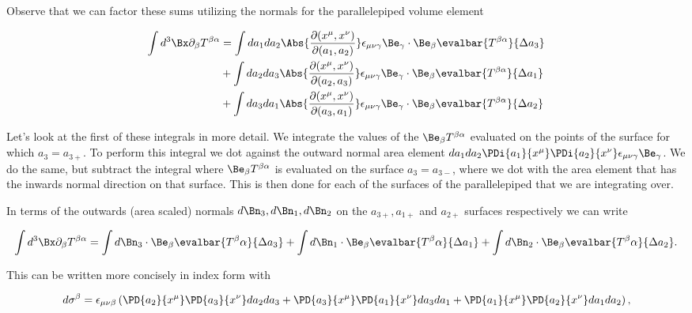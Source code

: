 Observe that we can factor these sums utilizing the normals for the parallelepiped volume element

\begin{align*}
\int d^3 \Bx \partial_\beta T^{\beta \alpha}
&=
\int da_1 da_2 
\Abs{ \frac{\partial(x^\mu, x^\nu)}{\partial (a_1, a_2)}} \epsilon_{\mu \nu \gamma} \Be_\gamma \cdot \Be_\beta
\evalbar{T^{\beta \alpha}}{\Delta a_3} \\
&+
\int da_2 da_3 
\Abs{ \frac{\partial(x^\mu, x^\nu)}{\partial (a_2, a_3)}} \epsilon_{\mu \nu \gamma} \Be_\gamma \cdot \Be_\beta
\evalbar{T^{\beta \alpha}}{\Delta a_1} \\
&+
\int da_3 da_1 
\Abs{ \frac{\partial(x^\mu, x^\nu)}{\partial (a_3, a_1)}} \epsilon_{\mu \nu \gamma} \Be_\gamma \cdot \Be_\beta
\evalbar{T^{\beta \alpha}}{\Delta a_2}
\end{align*}

Let's look at the first of these integrals in more detail.  We integrate the values of the $\Be_\beta T^{\beta \alpha}$ evaluated on the points of the surface for which $a_3 = a_{3+}$.  To perform this integral we dot against the outward normal area element $da_1 da_2 \PDi{a_1}{x^\mu} \PDi{a_2}{x^\nu} \epsilon_{\mu\nu\gamma} \Be_\gamma$.  We do the same, but subtract the integral where $\Be_\beta T^{\beta\alpha}$ is evaluated on the surface $a_3 = a_{3-}$, where we dot with the area element that has the inwards normal direction on that surface.  This is then done for each of the surfaces of the parallelepiped that we are integrating over.

In terms of the outwards (area scaled) normals $d\Bn_3, d\Bn_1, d\Bn_2$ on the $a_{3+}, a_{1+}$ and $a_{2+}$ surfaces respectively we can write

\begin{equation}\label{eqn:relativisticElectrodynamicsPS6:540}
\int d^3 \Bx \partial_\beta T^{\beta \alpha} = 
\int d\Bn_3 \cdot \Be_\beta \evalbar{T^{\beta}{\alpha}}{\Delta a_3}
+\int d\Bn_1 \cdot \Be_\beta \evalbar{T^{\beta}{\alpha}}{\Delta a_1}
+\int d\Bn_2 \cdot \Be_\beta \evalbar{T^{\beta}{\alpha}}{\Delta a_2}.
\end{equation}

This can be written more concisely in index form with

\begin{equation}\label{eqn:relativisticElectrodynamicsPS6:640}
d \sigma^\beta = 
\epsilon_{\mu\nu\beta} \left(
\PD{a_2}{x^\mu}
\PD{a_3}{x^\nu} da_2 da_3
+\PD{a_3}{x^\mu}
\PD{a_1}{x^\nu} da_3 da_1
+\PD{a_1}{x^\mu}
\PD{a_2}{x^\nu} da_1 da_2
\right),
\end{equation}

